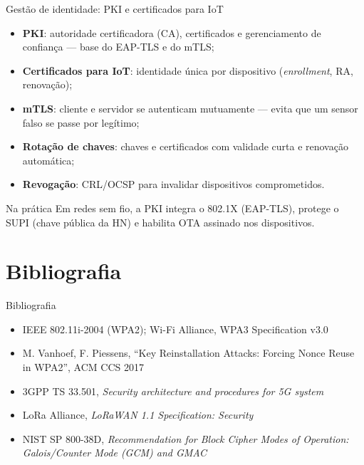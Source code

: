\documentclass[aspectratio=169,11pt]{beamer}
\begin{document}
\begin{frame}{Gestão de identidade: PKI e certificados para IoT}
  \begin{itemize}
    \item \textbf{PKI}: autoridade certificadora (CA), certificados e gerenciamento de confiança --- base do EAP-TLS e do mTLS;
    \item \textbf{Certificados para IoT}: identidade única por dispositivo (\emph{enrollment}, RA, renovação);
    \item \textbf{mTLS}: cliente e servidor se autenticam mutuamente --- evita que um sensor falso se passe por legítimo;
    \item \textbf{Rotação de chaves}: chaves e certificados com validade curta e renovação automática;
    \item \textbf{Revogação}: CRL/OCSP para invalidar dispositivos comprometidos.
  \end{itemize}
  \begin{alertblock}{Na prática}
    Em redes sem fio, a PKI integra o 802.1X (EAP-TLS), protege o SUPI (chave pública da HN) e habilita OTA assinado nos dispositivos.
  \end{alertblock}
\end{frame}

\section{Bibliografia}

\begin{frame}{Bibliografia}
  \begin{itemize}
    \item IEEE 802.11i-2004 (WPA2); Wi-Fi Alliance, WPA3 Specification v3.0
    \item M. Vanhoef, F. Piessens, ``Key Reinstallation Attacks: Forcing Nonce Reuse in WPA2'', ACM CCS 2017
    \item 3GPP TS 33.501, \emph{Security architecture and procedures for 5G system}
    \item LoRa Alliance, \emph{LoRaWAN 1.1 Specification: Security}
    \item NIST SP 800-38D, \emph{Recommendation for Block Cipher Modes of Operation: Galois/Counter Mode (GCM) and GMAC}
  \end{itemize}
\end{frame}
\end{document}
